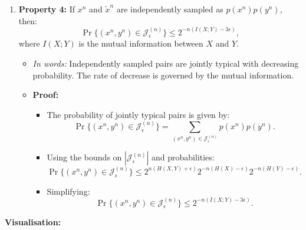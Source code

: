 \begin{enumerate}
    \item \textbf{Property 4:} If $x^n$ and $\tilde{x}^n$ are independently sampled as $p(x^n)p(y^n)$, then:
    \[
    \Pr\{(x^n, y^n) \in \mathcal{J}_\epsilon^{(n)} \} \leq 2^{-n(I(X; Y) - 3\epsilon)},
    \]
    where $I(X; Y)$ is the mutual information between $X$ and $Y$.
    \begin{itemize}
        \item \textit{In words:} Independently sampled pairs are jointly typical with decreasing probability. The rate of decrease is governed by the mutual information.
        \item \textbf{Proof:}
        \begin{itemize}
            \item The probability of jointly typical pairs is given by:
            \[
            \Pr\{(x^n, y^n) \in \mathcal{J}_\epsilon^{(n)} \} = \sum_{(x^n, y^n) \in \mathcal{J}_\epsilon^{(n)}} p(x^n)p(y^n).
            \]
            \item Using the bounds on $|\mathcal{J}_\epsilon^{(n)}|$ and probabilities:
            \[
            \Pr\{(x^n, y^n) \in \mathcal{J}_\epsilon^{(n)} \} \leq 2^{n(H(X, Y) + \epsilon)} 2^{-n(H(X) - \epsilon)} 2^{-n(H(Y) - \epsilon)}.
            \]
            \item Simplifying:
            \[
            \Pr\{(x^n, y^n) \in \mathcal{J}_\epsilon^{(n)} \} \leq 2^{-n(I(X; Y) - 3\epsilon)}.
            \]
        \end{itemize}
    \end{itemize}
\end{enumerate}

\medskip

\textbf{Visualisation:}


